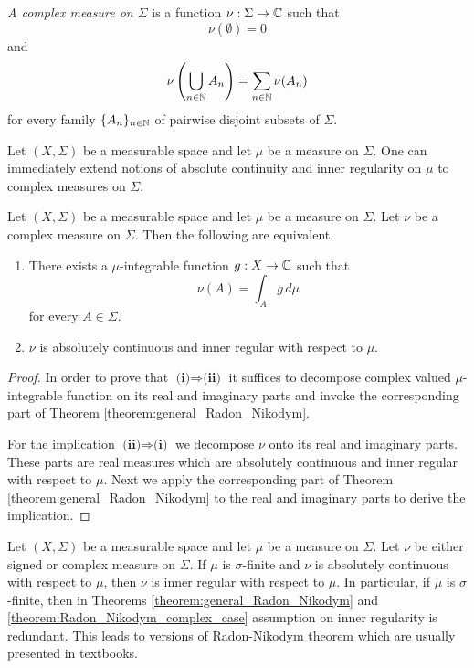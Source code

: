 \begin{definition}
    \textit{A complex measure on $\Sigma$} is a function $\nu:\Sigma\rightarrow {\mathbb C}$ such that $$\nu(\emptyset)=0$$
    and
    $$\nu\left(\bigcup_{n\in {\mathbb N}}A_n\right)=\sum_{n\in {\mathbb N}}\nu(A_n)$$
    for every family $\{A_n\}_{n\in {\mathbb N}}$ of pairwise disjoint subsets of $\Sigma$.
\end{definition}

\begin{remark}\label{remark:absolute_continuity_and_inner_regularity_can_be_extended_to_complex_measures}
    Let $(X,\Sigma)$ be a measurable space and let $\mu$ be a measure on $\Sigma$. One can immediately extend notions of absolute continuity and inner regularity on $\mu$ to complex measures on $\Sigma$.
\end{remark}

\begin{theorem}\label{theorem:Radon_Nikodym_complex_case}
    Let $(X,\Sigma)$ be a measurable space and let $\mu$ be a measure on $\Sigma$. Let $\nu$ be a complex measure on $\Sigma$. Then the following are equivalent.
    \begin{enumerate}[label=\emph{\textbf{(\roman*)}}, leftmargin=3.0em]
        \item There exists a $\mu$-integrable function $g:X\rightarrow {\mathbb C}$ such that
              $$\nu(A) = \int_Ag\,d\mu$$
              for every $A \in \Sigma$.
        \item $\nu$ is absolutely continuous and inner regular with respect to $\mu$.
    \end{enumerate}
\end{theorem}
\begin{proof}
    In order to prove that $\textbf{(i)}\Rightarrow \textbf{(ii)}$ it suffices to decompose complex valued $\mu$-integrable function on its real and imaginary parts and invoke the corresponding part of Theorem \ref{theorem:general_Radon_Nikodym}.

    For the implication $\textbf{(ii)}\Rightarrow \textbf{(i)}$ we decompose $\nu$ onto its real and imaginary parts. These parts are real measures which are absolutely continuous and inner regular with respect to $\mu$. Next we apply the corresponding part of Theorem \ref{theorem:general_Radon_Nikodym} to the real and imaginary parts to derive the implication.
\end{proof}

\begin{remark}\label{remark:Radon_Nikodym_for_sigma_finite_measures}
    Let $(X,\Sigma)$ be a measurable space and let $\mu$ be a measure on $\Sigma$. Let $\nu$ be either signed or complex measure on $\Sigma$. If $\mu$ is $\sigma$-finite and $\nu$ is absolutely continuous with respect to $\mu$, then $\nu$ is inner regular with respect to $\mu$. In particular, if $\mu$ is $\sigma$-finite, then in Theorems \ref{theorem:general_Radon_Nikodym} and \ref{theorem:Radon_Nikodym_complex_case} assumption on inner regularity is redundant. This leads to versions of Radon-Nikodym theorem which are usually presented in textbooks.
\end{remark}

